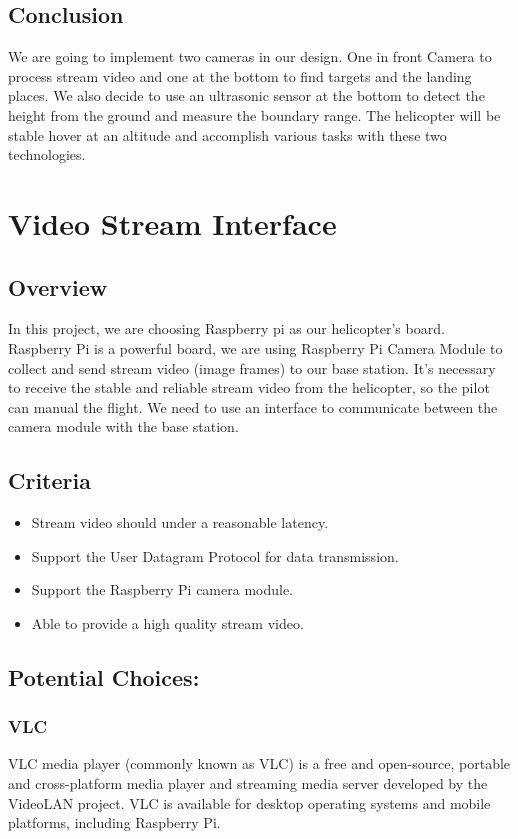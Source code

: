 \documentclass[letterpaper, 10, draftclsnofoot, onecolumn,compsoc]{IEEEtran}
\begin{document}
\subsection{Conclusion}
We are going to implement two cameras in our design. One in front Camera to process stream video and one at the bottom to find targets and the landing places. We also decide to use an ultrasonic sensor at the bottom to detect the height from the ground and measure the boundary range. The helicopter will be stable hover at an altitude and accomplish various tasks with these two technologies.

\vspace{2mm}
\section{Video Stream Interface}
\subsection{Overview}
In this project, we are choosing Raspberry pi as our helicopter’s board. Raspberry Pi is a powerful board, we are using Raspberry Pi Camera Module to collect and send stream video (image frames) to our base station. It’s necessary to receive the stable and reliable stream video from the helicopter, so the pilot can manual the flight. We need to use an interface to communicate between the camera module with the base station.

\subsection{Criteria}
\begin{itemize} 
\item  Stream video should under a reasonable latency.
\item  Support the User Datagram Protocol for data transmission.
\item  Support the Raspberry Pi camera module.
\item  Able to provide a high quality stream video.
\end{itemize}
\subsection{Potential Choices:}
\subsubsection{VLC}
VLC media player (commonly known as VLC) is a free and open-source, portable and cross-platform media player and streaming media server developed by the VideoLAN project. VLC is available for desktop operating systems and mobile platforms, including Raspberry Pi. \cite{r4} 
\end{document}
